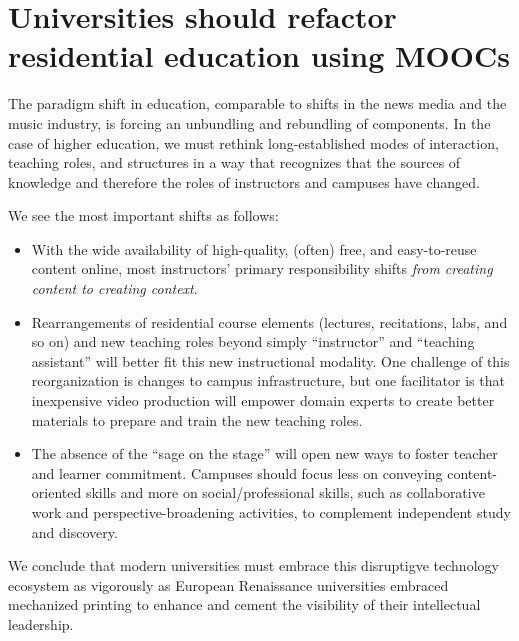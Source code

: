 \section{Universities should refactor residential education using MOOCs}



The paradigm shift in education, comparable to shifts
in the news media and the music industry,
is forcing an unbundling and rebundling of components. In the
case of higher education, 
we must rethink long-established modes of interaction, teaching roles,
and structures in a way that recognizes
that the sources of knowledge and therefore the roles of instructors and
campuses have changed.

We see the most important shifts as follows:

\begin{itemize}

\item With the wide availability of high-quality, (often) free, and
easy-to-reuse content online, most instructors' primary responsibility
shifts \emph{from creating content to creating context}.

\item Rearrangements of residential course elements (lectures,
  recitations, labs, and so on) and new teaching roles beyond simply ``instructor''
  and ``teaching assistant'' will better fit this new instructional
  modality.  One challenge of this reorganization is changes to campus
  infrastructure, but one facilitator is that inexpensive video production
  will empower domain experts to create 
  better materials to prepare and train the new teaching roles.

\item The absence of the ``sage on the stage'' will open new ways to
foster teacher and learner commitment.  Campuses should
focus less on conveying content-oriented skills and more on
social/professional skills, such as collaborative work and
perspective-broadening activities, to complement  independent study
and discovery.

\end{itemize} 

We conclude that modern universities must embrace this disruptigve
technology ecosystem as vigorously as European Renaissance universities
embraced mechanized printing to enhance and cement the
visibility of their intellectual leadership.


